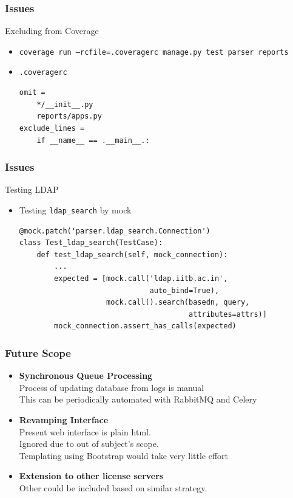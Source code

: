\documentclass{beamer}
\begin{document}
\begin{frame}[fragile]
    \frametitle{Issues}
    \begin{block}{Excluding from Coverage}
        \begin{itemize}
            \item \texttt{coverage run --rcfile=.coveragerc manage.py test parser reports}
            \item \texttt{.coveragerc}
            \begin{verbatim}
omit =
    */__init__.py
    reports/apps.py
exclude_lines =
    if __name__ == .__main__.:
    \end{verbatim}
        \end{itemize}
    \end{block}
\end{frame}

\begin{frame}[fragile]
    \frametitle{Issues}
    \begin{block}{Testing LDAP}
        \begin{itemize}
            \item Testing \texttt{ldap\_search} by mock
            \begin{verbatim}
@mock.patch('parser.ldap_search.Connection')
class Test_ldap_search(TestCase):
    def test_ldap_search(self, mock_connection):
        ...
        expected = [mock.call('ldap.iitb.ac.in',
                              auto_bind=True),
                    mock.call().search(basedn, query,
                                       attributes=attrs)]
        mock_connection.assert_has_calls(expected)
    \end{verbatim}
        \end{itemize}
    \end{block}
\end{frame}


\begin{frame}
    \frametitle{Future Scope}
    \begin{itemize}
        \item \textbf{Synchronous Queue Processing}\\Process of updating database from logs is manual\\This can be periodically automated with RabbitMQ and Celery
        \item \textbf{Revamping Interface}\\Present web interface is plain html.\\Ignored due to out of subject's scope.\\Templating using Bootstrap would take very little effort
        \item \textbf{Extension to other license servers}\\Other could be included based on similar strategy.
    \end{itemize}
\end{frame}
\end{document}
